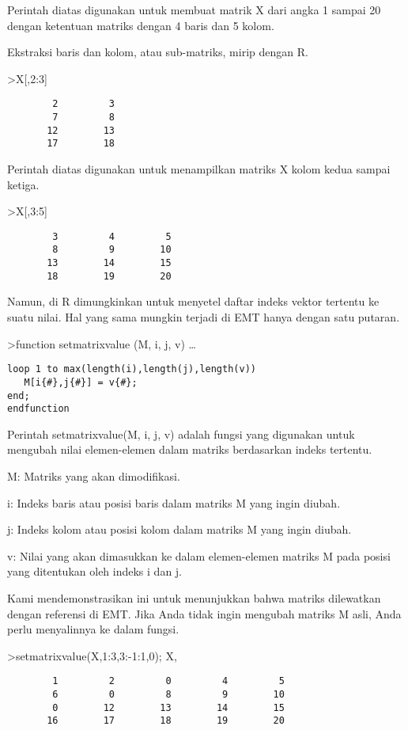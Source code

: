 \documentclass[
]{book}
\begin{document}
Perintah diatas digunakan untuk membuat matrik X dari angka 1 sampai 20 dengan ketentuan matriks dengan 4 baris dan 5 kolom.

Ekstraksi baris dan kolom, atau sub-matriks, mirip dengan R.

\textgreater X{[},2:3{]}

\begin{verbatim}
        2         3 
        7         8 
       12        13 
       17        18 
\end{verbatim}

Perintah diatas digunakan untuk menampilkan matriks X kolom kedua sampai ketiga.

\textgreater X{[},3:5{]}

\begin{verbatim}
        3         4         5 
        8         9        10 
       13        14        15 
       18        19        20 
\end{verbatim}

Namun, di R dimungkinkan untuk menyetel daftar indeks vektor tertentu ke suatu nilai. Hal yang sama mungkin terjadi di EMT hanya dengan satu putaran.

\textgreater function setmatrixvalue (M, i, j, v) \ldots{}

\begin{verbatim}
loop 1 to max(length(i),length(j),length(v))
   M[i{#},j{#}] = v{#};
end;
endfunction
\end{verbatim}

Perintah setmatrixvalue(M, i, j, v) adalah fungsi yang digunakan untuk mengubah nilai elemen-elemen dalam matriks berdasarkan indeks tertentu.

M: Matriks yang akan dimodifikasi.

i: Indeks baris atau posisi baris dalam matriks M yang ingin diubah.

j: Indeks kolom atau posisi kolom dalam matriks M yang ingin diubah.

v: Nilai yang akan dimasukkan ke dalam elemen-elemen matriks M pada posisi yang ditentukan oleh indeks i dan j.

Kami mendemonstrasikan ini untuk menunjukkan bahwa matriks dilewatkan dengan referensi di EMT. Jika Anda tidak ingin mengubah matriks M asli, Anda perlu menyalinnya ke dalam fungsi.

\textgreater setmatrixvalue(X,1:3,3:-1:1,0); X,

\begin{verbatim}
        1         2         0         4         5 
        6         0         8         9        10 
        0        12        13        14        15 
       16        17        18        19        20 
\end{verbatim}
\end{document}
